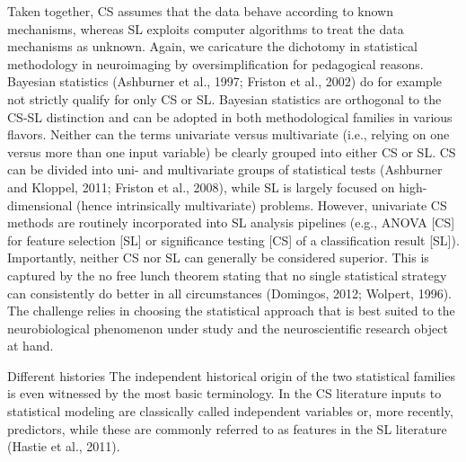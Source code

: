 \documentclass[authoryear,review,3p]{elsarticle}
\begin{document}
Taken together, CS assumes that the data behave according to known mechanisms, whereas SL exploits computer algorithms to treat the data mechanisms as unknown. Again, we caricature the dichotomy in statistical methodology in neuroimaging by oversimplification for pedagogical reasons. Bayesian statistics (Ashburner et al., 1997; Friston et al., 2002) do for example not strictly qualify for only CS or SL. Bayesian statistics are orthogonal to the CS-SL distinction and can be adopted in both methodological families in various flavors. Neither can the terms univariate versus multivariate (i.e., relying on one versus more than one input variable) be clearly grouped into either CS or SL. CS can be divided into uni- and multivariate groups of statistical tests (Ashburner and Kloppel, 2011; Friston et al., 2008), while SL is largely focused on high-dimensional (hence intrinsically multivariate) problems. However, univariate CS methods are routinely incorporated into SL analysis pipelines (e.g., ANOVA [CS] for feature selection [SL] or significance testing [CS] of a classification result [SL]). Importantly, neither CS nor SL can generally be considered superior. This is captured by the no free lunch theorem stating that no single statistical strategy can consistently do better in all circumstances (Domingos, 2012; Wolpert, 1996). The challenge relies in choosing the statistical approach that is best suited to the neurobiological phenomenon under study and the neuroscientific research object at hand.

Different histories
The independent historical origin of the two statistical families is even witnessed by the most basic terminology. In the CS literature inputs to statistical modeling are classically called independent variables or, more recently, predictors, while these are commonly referred to as features in the SL literature (Hastie et al., 2011).
\end{document}

